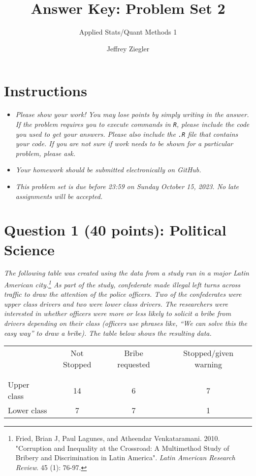 \documentclass[12pt,letterpaper]{article}
\title{Answer Key: Problem Set 2}
\date{Jeffrey Ziegler}
\author{Applied Stats/Quant Methods 1}
\begin{document}
	\maketitle
	
	\section*{Instructions}
	\begin{itemize}
	\item \textit{Please show your work! You may lose points by simply writing in the answer. If the problem requires you to execute commands in \texttt{R}, please include the code you used to get your answers. Please also include the \texttt{.R} file that contains your code. If you are not sure if work needs to be shown for a particular problem, please ask.}
	\item \textit{Your homework should be submitted electronically on GitHub.}
	\item \textit{This problem set is due before 23:59 on Sunday October 15, 2023. No late assignments will be accepted.}
	\end{itemize}
	
	\vspace{.5cm}
	\section*{Question 1 (40 points): Political Science}
		\vspace{.25cm}
\textit{The following table was created using the data from a study run in a major Latin American city.\footnote{Fried, Brian J, Paul Lagunes, and Atheendar Venkataramani. 2010. "Corruption and Inequality at the Crossroad: A Multimethod Study of Bribery and Discrimination in Latin America". \textit{Latin American Research Review}. 45 (1): 76-97.} As part of the study, confederate made illegal left turns across traffic to draw the attention of the police officers.  Two of the confederates were upper class drivers and two were lower class drivers.  The researchers were interested in whether officers were more or less likely to solicit a bribe from drivers depending on their class (officers use phrases like, ``We can solve this the easy way'' to draw a bribe).  The table below shows the resulting data.}

\begin{table}[h!]
	\centering
	\begin{adjustbox}{max width=.75\textwidth}
		\begin{tabular}{l | c c c }
			& Not Stopped & Bribe requested & Stopped/given warning \\
			\\[-1.8ex] 
			\hline \\[-1.8ex]
			Upper class & 14 & 6 & 7 \\
			Lower class & 7 & 7 & 1 \\
			\hline
		\end{tabular}
	\end{adjustbox}
\end{table}
\end{document}
